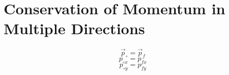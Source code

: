 \documentclass[fleqn]{article}
\begin{document}
\setlength{\mathindent}{0pt}
\section*{Conservation of Momentum in Multiple Directions}

\[ \vec{p}_{\circ} = \vec{p}_{f}     \]
\[ {p} _{\circ x}  = {p} _{fx}   \]
\[ {p} _{\circ y} = {p} _{fy}   \]
\end{document}
